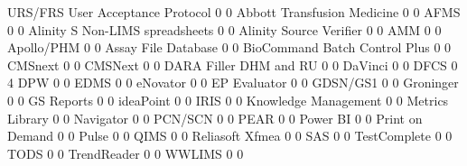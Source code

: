 \documentclass{article}
\begin{document}
\begin{Schunk}
\begin{Soutput}
                                  URS/FRS User Acceptance Protocol
                                        0                        0
  Abbott Transfusion Medicine           0                        0
  AFMS                                  0                        0
  Alinity S Non-LIMS spreadsheets       0                        0
  Alinity Source Verifier               0                        0
  AMM                                   0                        0
  Apollo/PHM                            0                        0
  Assay File Database                   0                        0
  BioCommand Batch Control Plus         0                        0
  CMSnext                               0                        0
  CMSNext                               0                        0
  DARA Filler DHM and RU                0                        0
  DaVinci                               0                        0
  DFCS                                  0                        4
  DPW                                   0                        0
  EDMS                                  0                        0
  eNovator                              0                        0
  EP Evaluator                          0                        0
  GDSN/GS1                              0                        0
  Groninger                             0                        0
  GS Reports                            0                        0
  ideaPoint                             0                        0
  IRIS                                  0                        0
  Knowledge Management                  0                        0
  Metrics Library                       0                        0
  Navigator                             0                        0
  PCN/SCN                               0                        0
  PEAR                                  0                        0
  Power BI                              0                        0
  Print on Demand                       0                        0
  Pulse                                 0                        0
  QIMS                                  0                        0
  Reliasoft Xfmea                       0                        0
  SAS                                   0                        0
  TestComplete                          0                        0
  TODS                                  0                        0
  TrendReader                           0                        0
  WWLIMS                                0                        0
                                 

\end{Soutput}
\end{Schunk}
\end{document}
